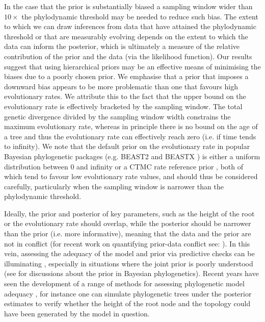 \documentclass[11pt]{article}
\begin{document}
In the case that the prior is substantially biased a sampling window wider than $10\times$ the phylodynamic threshold may be needed to reduce such bias. The extent to which we can draw inferences from data that have attained the phylodynamic threshold or that are measurably evolving depends on the extent to which the data can inform the posterior, which is ultimately a measure of the relative contribution of the prior and the data (via the likelihood function). Our results suggest that using hierarchical priors may be an effective means of minimising the biases due to a poorly chosen prior. We emphasise that a prior that imposes a downward bias appears to be more problematic than one that favours high evolutionary rates. We attribute this to the fact that the upper bound on the evolutionary rate is effectively bracketed by the sampling window. The total genetic divergence divided by the sampling window width constrains the maximum evolutionary rate, whereas in principle there is no bound on the age of a tree and thus the evolutionary rate can effectively reach zero (i.e. if time tends to infinity). We note that the default prior on the evolutionary rate in popular Bayesian phylogenetic packages (e.g. BEAST2 \citep{bouckaert2019beast} and BEASTX \citep{baele2025beast}) is either a uniform distribution between 0 and infinity or a CTMC rate reference prior \citep{ferreira2008bayesian, wang2014priors}, both of which tend to favour low evolutionary rate values, and should thus be considered carefully, particularly when the sampling window is narrower than the phylodynamic threshold.

Ideally, the prior and posterior of key parameters, such as the height of the root or the evolutionary rate should overlap, while the posterior should be narrower than the prior (i.e. more informative), meaning that the data and the prior are not in conflict (for recent work on quantifying prior-data conflict see: \citealt{nott2020checking}). In this vein, assessing the adequacy of the model and prior via predictive checks can be illuminating \citep{mcelreath2018statistical}, especially in situations where the joint prior is poorly understood (see \citealt{baele2014bayesian, wang2014priors} for discussions about the prior in Bayesian phylogenetics). Recent years have seen the development of a range of methods for assessing phylogenetic model adequacy \citep{duchene2019phylodynamic, mcelreath2018statistical, brown2018evaluating, duchene2018phylomad}, for instance one can simulate phylogenetic trees under the posterior estimates to verify whether the height of the root node and the topology could have been generated by the model in question. 
\end{document}
